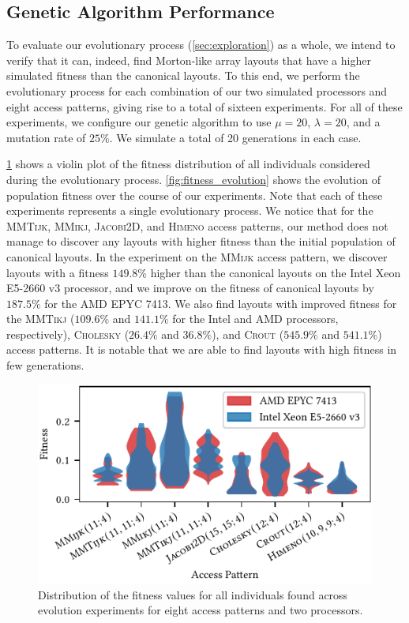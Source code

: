\subsection{Genetic Algorithm Performance}

\label{sec:expr:evolution}
To evaluate our evolutionary process (\cref{sec:exploration}) as a whole,  
we intend to verify that it can, indeed, find Morton-like array layouts that have a higher simulated fitness than the canonical layouts. To this end, we perform the evolutionary process for each combination of our two simulated processors and eight access patterns, giving rise to a total of sixteen experiments. For all of these experiments, we configure our genetic algorithm to use $\mu = 20$, $\lambda = 20$, and a mutation rate of $25\%$. We simulate a total of \num{20} generations in each case.

\cref{fig:fitness_violin} shows a violin plot of the fitness distribution of all individuals considered during the evolutionary process. \cref{fig:fitness_evolution} shows the evolution of population fitness over the course of our experiments. Note that each of these experiments represents a single evolutionary process. We notice that for the \textsc{MMTijk}, \textsc{MMikj}, \textsc{Jacobi2D}, and \textsc{Himeno} access patterns, our method does not manage to discover any layouts with higher fitness than the initial population of canonical layouts. In the experiment on the \textsc{MMijk} access pattern, we discover layouts with a fitness $149.8\%$ higher than the canonical layouts on the Intel Xeon E5-2660 v3 processor, and we improve on the fitness of canonical layouts by $187.5\%$ for the AMD EPYC 7413. We also find layouts with improved fitness for the \textsc{MMTikj} ($109.6\%$ and $141.1\%$ for the Intel and AMD processors, respectively), \textsc{Cholesky} ($26.4\%$ and $36.8\%$), and \textsc{Crout} ($545.9\%$ and $541.1\%$) access patterns. It is notable that we are able to find layouts with high fitness in few generations.

\begin{figure}
    \centering
    \includegraphics{figures/fitness_violin.pdf}
    \caption{Distribution of the fitness values for all individuals found across evolution experiments for eight access patterns and two processors.}
    \label{fig:fitness_violin}
\end{figure}

